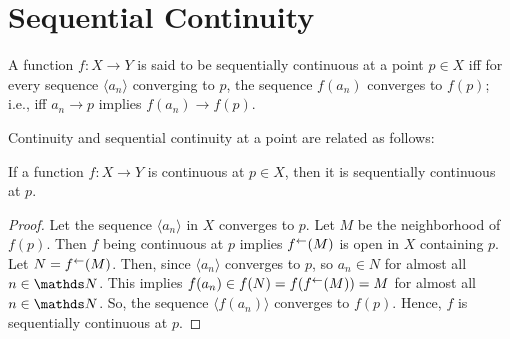 \documentclass[../main-sheet.tex]{subfiles}
\begin{document}
\section{Sequential Continuity}
\begin{defn}
    A function \(f:X\to Y\) is said to be sequentially continuous at a point \(p\in X\) iff for every sequence \(\langle a_n\rangle\) converging to \(p\), the sequence \(f(a_n)\) converges to \(f(p)\); i.e., iff \(a_n\to p\) implies \(f(a_n)\to f(p)\).
\end{defn}
Continuity and sequential continuity at a point are related as follows:
\begin{thm}
    If a function \(f:X\to Y\) is continuous at \(p\in X\), then it is sequentially continuous at  \(p\).
\end{thm}
\begin{proof}
    Let the sequence \(\langle a_n\rangle\) in \(X\) converges to \(p\). Let \(M\) be the neighborhood of \(f(p)\). Then \(f\) being continuous at \(p\) implies \(f^{\leftarrow}(M)\) is open in \(X\) containing \(p\). Let \(N=f^{\leftarrow}(M)\). Then, since \(\langle a_n\rangle\) converges to \(p\), so \(a_n\in N\) for almost all \(n\in \N\). This implies \(f(a_n)\in f(N)=f(f^{\leftarrow}(M))=M\) for almost all \(n\in \N\). So, the sequence \(\langle f(a_n)\rangle\) converges to \(f(p)\). Hence, \(f\) is sequentially continuous at  \(p\).
\end{proof}
\end{document}
